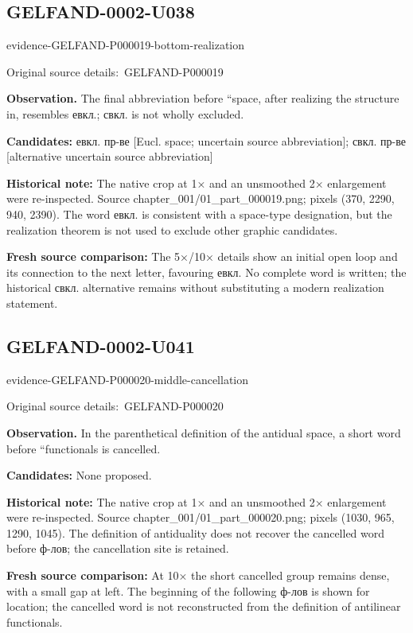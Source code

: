 \documentclass[11pt]{article}
\newcommand{\EvidenceBlock}[4]{%
 \par\smallskip\noindent\begin{minipage}{\linewidth}
 \begin{minipage}[t]{.47\linewidth}\vspace{0pt}\centering
 \csname evidence-#1-#2\endcsname\par
 {\scriptsize\SourceCropCaption\ #1}\par
 \end{minipage}\hfill
 \begin{minipage}[t]{.49\linewidth}\vspace{0pt}\raggedright
 {\small\color{orange!65!black}\textbf{#4} #3}\par
 \end{minipage}
 \end{minipage}\par\smallskip}
\newcommand{\SourceCropCaption}{Original source details:}\newcommand{\ReadingCaption}{Uncertain reading.}\newcommand{\IncompleteCaption}{Undeciphered passage.}\newcommand{\DiagramCaption}{Diagram and typed description.}
\begin{document}
\subsection*{GELFAND-0002-U038}
\EvidenceBlock{GELFAND-P000019}{bottom-realization}{The final abbreviation before ``space, after realizing the structure in, resembles евкл.; свкл. is not wholly excluded.}{Observation.}
\par\smallskip\noindent\textbf{Candidates: } евкл. пр-ве [Eucl. space; uncertain source abbreviation]; свкл. пр-ве [alternative uncertain source abbreviation]\par
\par\smallskip\noindent\textbf{Historical note: } The native crop at 1× and an unsmoothed 2× enlargement were re-inspected. Source chapter\_001/01\_part\_000019.png; pixels (370, 2290, 940, 2390). The word евкл. is consistent with a space-type designation, but the realization theorem is not used to exclude other graphic candidates.\par
\par\smallskip\noindent\textbf{Fresh source comparison: } The 5×/10× details show an initial open loop and its connection to the next letter, favouring евкл. No complete word is written; the historical свкл. alternative remains without substituting a modern realization statement.\par

\subsection*{GELFAND-0002-U041}
\EvidenceBlock{GELFAND-P000020}{middle-cancellation}{In the parenthetical definition of the antidual space, a short word before ``functionals is cancelled.}{Observation.}
\par\smallskip\noindent\textbf{Candidates: } None proposed.\par
\par\smallskip\noindent\textbf{Historical note: } The native crop at 1× and an unsmoothed 2× enlargement were re-inspected. Source chapter\_001/01\_part\_000020.png; pixels (1030, 965, 1290, 1045). The definition of antiduality does not recover the cancelled word before ф-лов; the cancellation site is retained.\par
\par\smallskip\noindent\textbf{Fresh source comparison: } At 10× the short cancelled group remains dense, with a small gap at left. The beginning of the following ф-лов is shown for location; the cancelled word is not reconstructed from the definition of antilinear functionals.\par
\end{document}
